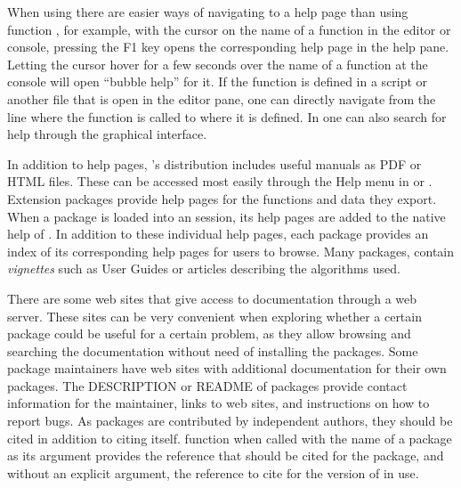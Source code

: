 \documentclass[krantz2]{krantz}\usepackage{knitr}
\begin{document}
When using \RStudio there are easier ways of navigating to a help page than using function , for example, with the cursor on the name of a function in the editor or console, pressing the F1 key opens the corresponding help page in the help pane. Letting the cursor hover for a few seconds over the name of a function at the \Rpgrm console will open ``bubble help'' for it. If the function is defined in a script or another file that is open in the editor pane, one can directly navigate from the line where the function is called to where it is defined. In \RStudio one can also search for help through the graphical interface.

In addition to help pages, \Rpgrm's distribution includes useful manuals as PDF or HTML files. These can be accessed most easily through the Help menu in \RStudio or . Extension packages provide help pages for the functions and data they export. When a package is loaded into an \Rpgrm session, its help pages are added to the native help of \Rpgrm. In addition to these individual help pages, each package provides an index of its corresponding help pages for users to browse. Many packages, contain \emph{vignettes} such as User Guides or articles describing the algorithms used.

There are some web sites that give access to \Rlang documentation through a web server. These sites can be very convenient when exploring whether a certain package could be useful for a certain problem, as they allow browsing and searching the documentation without need of installing the packages. Some package maintainers have web sites with additional documentation for their own packages. The DESCRIPTION or README of packages provide contact information for the maintainer, links to web sites, and instructions on how to report bugs. As packages are contributed by independent authors, they should be cited in addition to citing \Rpgrm itself. \Rlang function  when called with the name of a package as its argument provides the reference that should be cited for the package, and without an explicit argument, the reference to cite for the version of \Rlang in use.
\end{document}
